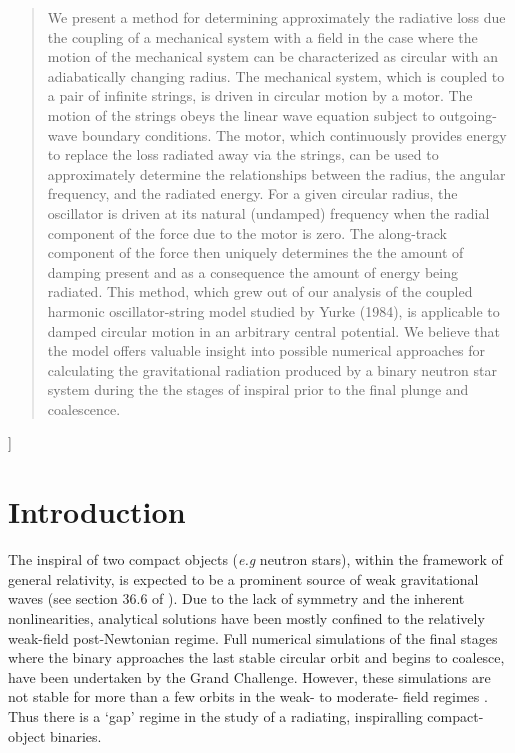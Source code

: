 %
%
\widetext
\begin{abstract}
We present a method for determining approximately the radiative 
loss due the coupling of a mechanical system with a field in the 
case where the motion of the mechanical system can be 
characterized as circular with an adiabatically changing radius. 
The mechanical system, which is coupled to a pair of infinite 
strings, is driven in circular motion by a motor.
The motion of the strings obeys the linear wave equation subject 
to outgoing-wave boundary conditions.  
The motor, which continuously provides energy to replace the loss 
radiated away via the strings, can be used to approximately 
determine the relationships between the radius, the angular 
frequency, and the radiated energy.  
For a given circular radius, the oscillator is driven at its 
natural (undamped) frequency when the radial component of the 
force due to the motor is zero.  
The along-track component of the force then uniquely determines 
the the amount of damping present and as a consequence the amount 
of energy being radiated.
This method, which grew out of our analysis of the coupled 
harmonic oscillator-string model studied by Yurke (1984), is 
applicable to damped circular motion in an arbitrary central 
potential.  
We believe that the model offers valuable insight into possible 
numerical approaches for calculating the gravitational radiation 
produced by a binary neutron star system during the the stages of 
inspiral prior to the final plunge and coalescence.
\end{abstract}

\narrowtext
\vskip2pc]


\section{Introduction}\label{sec:intro_level1}

The inspiral of two compact objects (\emph{e.g} neutron stars), 
within the framework of general relativity, is expected to be a 
prominent source of weak gravitational waves (see section 36.6 
of \cite{mtw}).  
Due to the lack of symmetry and the inherent nonlinearities, 
analytical solutions have been mostly confined to the relatively 
weak-field post-Newtonian regime.  
Full numerical simulations of the final stages where the binary 
approaches the last stable circular orbit and begins to coalesce, 
have been undertaken by the Grand Challenge.  
However, these simulations are not stable for more than a few 
orbits in the weak- to moderate- field regimes \cite{whelan}.
Thus there is a `gap' regime in the study of a radiating, 
inspiralling compact-object binaries.

